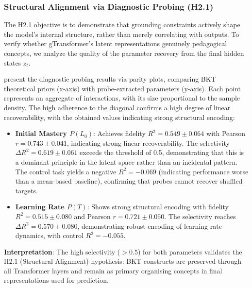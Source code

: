 \documentclass[applsci,article,submit,moreauthors,pdftex]{Definitions/mdpi}
\begin{document}
\subsubsection{Structural Alignment via Diagnostic Probing (H2.1)} \label{sec_structural_alignment}

The H2.1 objective is to demonstrate that grounding constraints actively shape the model's internal structure, rather than merely correlating with outputs. To verify whether gTransformer's latent representations genuinely  pedagogical concepts, we analyze the quality of the parameter recovery from the final hidden states $z_t$. 

 present the diagnostic probing results via parity plots, comparing BKT theoretical priors (x-axis) with probe-extracted parameters (y-axis). Each point represents an aggregate of interactions, with its size proportional to the sample density. The high adherence to the diagonal confirms a high degree of linear recoverability, with the obtained values indicating strong structural encoding:

\begin{itemize}
    \item \textbf{Initial Mastery $P(L_0)$}: Achieves fidelity $R^2 = 0.549 \pm 0.064$ with Pearson $r = 0.743 \pm 0.041$, indicating strong linear recoverability. The selectivity $\Delta R^2 = 0.619 \pm 0.061$ exceeds the threshold of 0.5, demonstrating that this is a dominant  principle in the latent space rather than an incidental pattern. The control task yields a negative $R^2 = -0.069$ (indicating performance worse than a mean-based baseline), confirming that probes cannot recover shuffled targets.
    
    \item \textbf{Learning Rate $P(T)$}: Shows strong structural encoding with fidelity $R^2 = 0.515 \pm 0.080$ and Pearson $r = 0.721 \pm 0.050$. The selectivity reaches $\Delta R^2 = 0.570 \pm 0.080$, demonstrating robust encoding of learning rate dynamics, with control $R^2 = -0.055$.
\end{itemize}

\textbf{Interpretation}: The high selectivity ($>0.5$) for both parameters validates the H2.1 (Structural Alignment) hypothesis: BKT constructs are preserved through all Transformer layers and remain as primary organising concepts in final representations used for prediction. 
\end{document}
